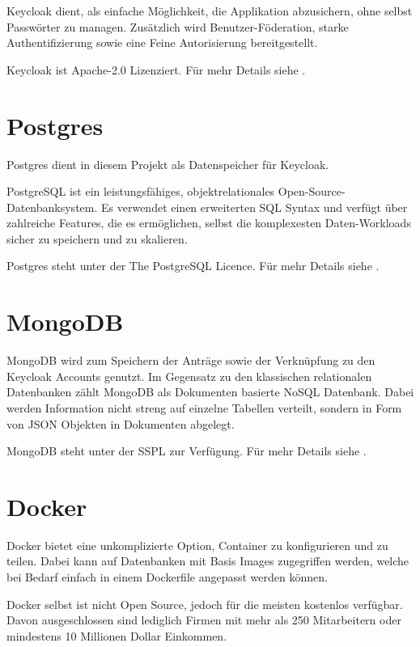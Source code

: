 Keycloak dient, als einfache Möglichkeit, die Applikation abzusichern, ohne selbst Passwörter zu managen.
Zusätzlich wird Benutzer-Föderation, starke Authentifizierung sowie eine Feine Autorisierung bereitgestellt.
\cite{about-keycloak}

Keycloak ist Apache-2.0 Lizenziert.
Für mehr Details siehe .

\section{Postgres}\label{sec:postgres}

Postgres dient in diesem Projekt als Datenspeicher für Keycloak.

PostgreSQL ist ein leistungsfähiges, objektrelationales Open-Source-Datenbanksystem.
Es verwendet einen erweiterten SQL Syntax und verfügt über zahlreiche Features,
die es ermöglichen, selbst die komplexesten Daten-Workloads sicher zu speichern und zu skalieren.
\cite{about-postgres}

Postgres steht unter der The PostgreSQL Licence.
Für mehr Details siehe .


\section{MongoDB}\label{sec:mongodb}

MongoDB wird zum Speichern der Anträge sowie der Verknüpfung zu den Keycloak Accounts genutzt.
Im Gegensatz zu den klassischen relationalen Datenbanken zählt MongoDB als Dokumenten basierte NoSQL Datenbank.
Dabei werden Information nicht streng auf einzelne Tabellen verteilt, sondern in Form von \ac{JSON} Objekten in Dokumenten abgelegt.

MongoDB steht unter der \acl{SSPL} zur Verfügung.
Für mehr Details siehe .

\section{Docker}\label{sec:docker}

Docker bietet eine unkomplizierte Option, Container zu konfigurieren und zu teilen.
Dabei kann auf Datenbanken mit Basis Images zugegriffen werden, welche bei Bedarf
einfach in einem Dockerfile angepasst werden können.

Docker selbst ist nicht Open Source, jedoch für die meisten kostenlos verfügbar.
Davon ausgeschlossen sind lediglich Firmen mit mehr als 250 Mitarbeitern oder mindestens 10 Millionen Dollar Einkommen.

